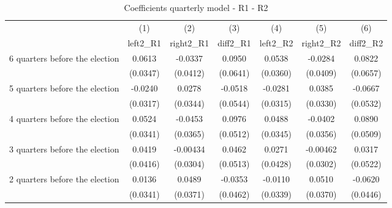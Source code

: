 \begin{table}[!ht]\centering \footnotesize
\def\sym#1{\ifmmode^{#1}\else\(^{#1}\)\fi}
\caption{Coefficients quarterly model - R1 - R2}
\begin{tabular}{l*{6}{c}}
\hline\hline
                    &\multicolumn{1}{c}{(1)}&\multicolumn{1}{c}{(2)}&\multicolumn{1}{c}{(3)}&\multicolumn{1}{c}{(4)}&\multicolumn{1}{c}{(5)}&\multicolumn{1}{c}{(6)}\\
                    &\multicolumn{1}{c}{left2\_R1}&\multicolumn{1}{c}{right2\_R1}&\multicolumn{1}{c}{diff2\_R1}&\multicolumn{1}{c}{left2\_R2}&\multicolumn{1}{c}{right2\_R2}&\multicolumn{1}{c}{diff2\_R2}\\
\hline
 6 quarters before the election&      0.0613         &     -0.0337         &      0.0950         &      0.0538         &     -0.0284         &      0.0822         \\
                    &    (0.0347)         &    (0.0412)         &    (0.0641)         &    (0.0360)         &    (0.0409)         &    (0.0657)         \\
[0,5em]
 5 quarters before the election&     -0.0240         &      0.0278         &     -0.0518         &     -0.0281         &      0.0385         &     -0.0667         \\
                    &    (0.0317)         &    (0.0344)         &    (0.0544)         &    (0.0315)         &    (0.0330)         &    (0.0532)         \\
[0,5em]
 4 quarters before the election&      0.0524         &     -0.0453         &      0.0976         &      0.0488         &     -0.0402         &      0.0890         \\
                    &    (0.0341)         &    (0.0365)         &    (0.0512)         &    (0.0345)         &    (0.0356)         &    (0.0509)         \\
[0,5em]
 3 quarters before the election&      0.0419         &    -0.00434         &      0.0462         &      0.0271         &    -0.00462         &      0.0317         \\
                    &    (0.0416)         &    (0.0304)         &    (0.0513)         &    (0.0428)         &    (0.0302)         &    (0.0522)         \\
[0,5em]
 2 quarters before the election&      0.0136         &      0.0489         &     -0.0353         &     -0.0110         &      0.0510         &     -0.0620         \\
                    &    (0.0341)         &    (0.0371)         &    (0.0462)         &    (0.0339)         &    (0.0370)         &    (0.0446)         \\

\end{tabular}
\end{table}
